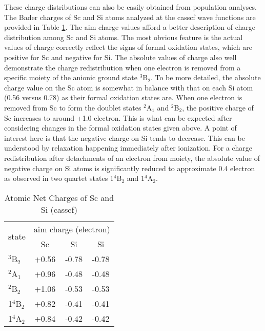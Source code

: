 \begin{refsection}
These charge distributions can also be easily obtained from population analyses. The Bader charges of Sc and Si atoms analyzed at the \acrshort{casscf} wave functions are provided in Table \ref{tbl3:charge}. The \acrshort{aim} charge values afford a better description of charge distribution among Sc and Si atoms. The most obvious feature is the actual values of charge correctly reflect the signs of formal oxidation states, which are positive for Sc and negative for Si. The absolute values of charge also well demonstrate the charge redistribution when one electron is removed from a specific moiety of the anionic ground state $^3$B$_2$. To be more detailed, the absolute charge value on the Sc atom is somewhat in balance with that on each Si atom (0.56 versus 0.78) as their formal oxidation states are. When one electron is removed from Sc to form the doublet states $^2$A$_1$ and $^2$B$_2$, the positive charge of Sc increases to around +1.0 electron. This is what can be expected after considering changes in the formal oxidation states given above. A point of interest here is that the negative charge on Si tends to decrease. This can be understood by relaxation happening immediately after ionization. For a charge redistribution after detachments of an electron from  moiety, the absolute value of negative charge on Si atoms is significantly reduced to approximate 0.4 electron as observed in two quartet states 1$^4$B$_2$ and 1$^4$A$_2$.




\begin{table}[htbp!]
	\centering
	\caption{Atomic Net Charges of Sc and Si (\acrshort{casscf})}
	\label{tbl3:charge}
	\begin{tabular}{@{}lccc@{}}
	\toprule
	\multirow{2}{*}{state} 		 & \multicolumn{3}{c}{\acrshort{aim} charge (electron)} \\ \cmidrule(l){2-4} 
						   		 & Sc           & Si           & Si          \\ \midrule
	$^3$B$_2$                    & +0.56        & -0.78        & -0.78       \\
	$^2$A$_1$                    & +0.96        & -0.48        & -0.48       \\
	$^2$B$_2$                    & +1.06        & -0.53        & -0.53       \\
	1$^4$B$_2$                   & +0.82        & -0.41        & -0.41       \\
	1$^4$A$_2$                   & +0.84        & -0.42        & -0.42       \\ \bottomrule
	\end{tabular}
\end{table}




\end{refsection}
